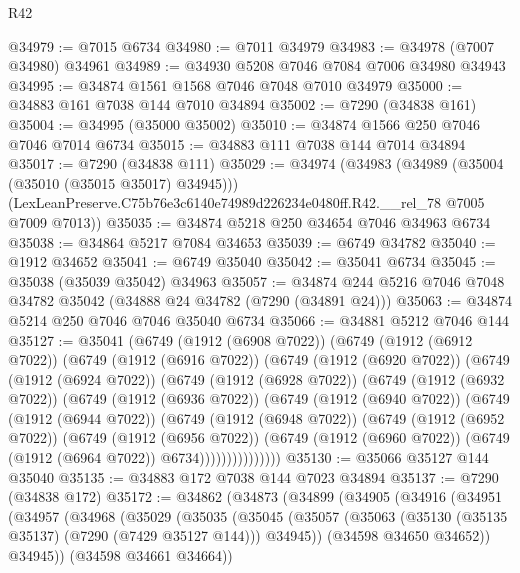 \begin{lexlean}{R42}
\begin{coremodule}
{@34979 := @7015 @6734
@34980 := @7011 @34979
@34983 := @34978 (@7007 @34980) @34961
@34989 := @34930 @5208 @7046 @7084 @7006 @34980 @34943
@34995 := @34874 @1561 @1568 @7046 @7048 @7010 @34979
@35000 := @34883 @161 @7038 @144 @7010 @34894
@35002 := @7290 (@34838 @161)
@35004 := @34995 (@35000 @35002)
@35010 := @34874 @1566 @250 @7046 @7046 @7014 @6734
@35015 := @34883 @111 @7038 @144 @7014 @34894
@35017 := @7290 (@34838 @111)
@35029 := @34974
    (@34983
      (@34989 (@35004 (@35010 (@35015 @35017) @34945)))
      (LexLeanPreserve.C75b76e3c6140e74989d226234e0480ff.R42.__rel_78 @7005 @7009 @7013))
@35035 := @34874 @5218 @250 @34654 @7046 @34963 @6734
@35038 := @34864 @5217 @7084 @34653
@35039 := @6749 @34782
@35040 := @1912 @34652
@35041 := @6749 @35040
@35042 := @35041 @6734
@35045 := @35038 (@35039 @35042) @34963
@35057 := @34874 @244 @5216 @7046 @7048 @34782 @35042 (@34888 @24 @34782 (@7290 (@34891 @24)))
@35063 := @34874 @5214 @250 @7046 @7046 @35040 @6734
@35066 := @34881 @5212 @7046 @144
@35127 := @35041
    (@6749
      (@1912 (@6908 @7022))
      (@6749
        (@1912 (@6912 @7022))
        (@6749
          (@1912 (@6916 @7022))
          (@6749
            (@1912 (@6920 @7022))
            (@6749
              (@1912 (@6924 @7022))
              (@6749
                (@1912 (@6928 @7022))
                (@6749
                  (@1912 (@6932 @7022))
                  (@6749
                    (@1912 (@6936 @7022))
                    (@6749
                      (@1912 (@6940 @7022))
                      (@6749
                        (@1912 (@6944 @7022))
                        (@6749
                          (@1912 (@6948 @7022))
                          (@6749
                            (@1912 (@6952 @7022))
                            (@6749
                              (@1912 (@6956 @7022))
                              (@6749
                                (@1912 (@6960 @7022))
                                (@6749 (@1912 (@6964 @7022)) @6734)))))))))))))))
@35130 := @35066 @35127 @144 @35040
@35135 := @34883 @172 @7038 @144 @7023 @34894
@35137 := @7290 (@34838 @172)
@35172 := @34862
    (@34873
      (@34899
        (@34905
          (@34916
            (@34951
              (@34957
                (@34968
                  (@35029
                    (@35035
                      (@35045
                        (@35057
                          (@35063 (@35130 (@35135 @35137) (@7290 (@7429 @35127 @144))) @34945))
                        (@34598 @34650 @34652))
                      @34945))
                  (@34598 @34661 @34664))
}
\end{coremodule}
\end{lexlean}
